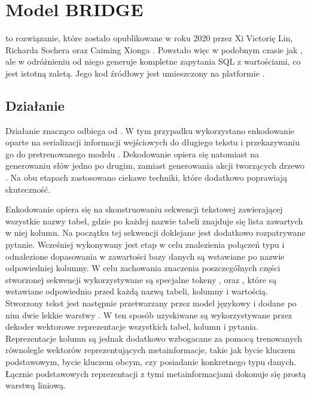 \section{Model BRIDGE}
 to rozwiązanie, które zostało opublikowane w roku 2020 przez Xi Victorię Lin, Richarda Sochera oraz Caiming Xionga . Powstało więc w podobnym czasie jak , ale w odróżnieniu od niego generuje kompletne zapytania SQL z wartościami, co jest istotną zaletą. Jego kod źródłowy jest umieszczony na platformie  .

\subsection{Działanie}
Działanie  znacząco odbiega od . W tym przypadku wykorzystano enkodowanie oparte na serializacji informacji wejściowych do długiego tekstu i przekazywaniu go do pretrenowanego modelu . Dekodowanie opiera się natomiast na generowaniu słów jedno po drugim, zamiast generowania akcji tworzących drzewo . Na obu etapach zastosowano ciekawe techniki, które dodatkowo poprawiają skuteczność.

Enkodowanie opiera się na skonstruowaniu sekwencji tekstowej zawierającej wszystkie nazwy tabel, gdzie po każdej nazwie tabeli znajduje się lista zawartych w niej kolumn. Na początku tej sekwencji doklejane jest dodatkowo rozpatrywane pytanie. Wcześniej wykonywany jest etap  w celu znalezienia połączeń typu  i odnalezione dopasowania w zawartości bazy danych są  wstawiane po nazwie odpowiedniej kolumny. W celu zachowania znaczenia poszczególnych części stworzonej sekwencji wykorzystywane są specjalne tokeny \code{[T]}, \code{[C]} oraz \code{[V]}, które są wstawiane odpowiednio przed każdą nazwą tabeli, kolumny i wartością. Stworzony tekst jest następnie przetwarzany przez model językowy  i dodane po nim dwie lekkie warstwy . W ten sposób uzyskiwane są wykorzystywane przez dekoder wektorowe reprezentacje wszystkich tabel, kolumn i pytania. Reprezentacje kolumn są jednak dodatkowo wzbogacane za pomocą trenowanych równolegle wektorów reprezentujących metainformacje, takie jak bycie kluczem podstawowym, bycie kluczem obcym, czy posiadanie konkretnego typu danych. Łącznie podstawowych reprezentacji z tymi metainformacjami dokonuje się prostą warstwą liniową.

